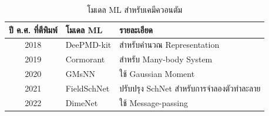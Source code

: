 \begin{table}[H]
    \centering
    \caption{โมเดล ML สำหรับเคมีควอนตัม}
    \label{tab:ml_qm_model}
    \begin{tabular}{cll}
    \toprule
    \textbf{ปี ค.ศ. ที่ตีพิมพ์} &\textbf{โมเดล ML} &\textbf{รายละเอียด} \\
    \midrule
    2018 &DeePMD-kit\autocite{wang2018} &สำหรับคำนวณ Representation \\
    2019 &Cormorant\autocite{anderson2019} &สำหรับ Many-body System \\
    2020 &GMsNN\autocite{zaverkin2020} &ใช้ Gaussian Moment \\
    2021 &FieldSchNet\autocite{gastegger2021} &ปรับปรุง SchNet สำหรับการจำลองตัวทำละลาย \\
    2022 &DimeNet\autocite{gasteiger2022} &ใช้ Message-passing \\
    \bottomrule
    \end{tabular}
\end{table}

